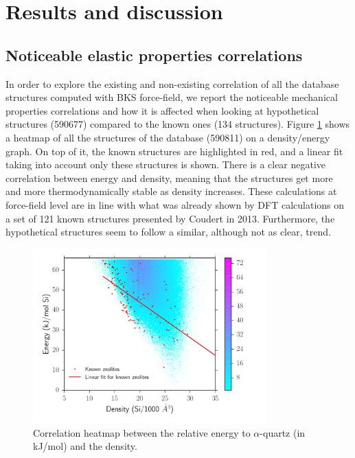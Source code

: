 \documentclass[journal=jacsat,manuscript=article]{achemso}
\begin{document}
\section{Results and discussion}

\subsection{Noticeable elastic properties correlations}

In order to explore the existing and non-existing correlation of all the database structures computed with BKS force-field, we report the noticeable mechanical properties correlations and how it is affected when looking at hypothetical structures (590677) compared to the known ones (134 structures). Figure \ref{corr_E_rho} shows a heatmap of all the structures of the database (590811) on a density/energy graph. On top of it, the known structures are highlighted in red, and a linear fit taking into account only these structures is shown. There is a clear negative correlation between energy and density, meaning that the structures get more and more thermodynamically stable as density increases. These calculations at force-field level are in line with what was already shown by DFT calculations on a set of 121 known structures presented by Coudert in 2013.\cite{Coudert2013} Furthermore, the hypothetical structures seem to follow a similar, although not as clear, trend.

\begin{figure}[ht!]\centering
\includegraphics[clip,trim=0cm 0cm 0cm 0.8cm,width=0.8\textwidth]{deem_database_17}
\caption{Correlation heatmap between the relative energy to $\alpha$-quartz (in kJ/mol) and the density.}
\label{corr_E_rho}
\end{figure}
		
\end{document}
